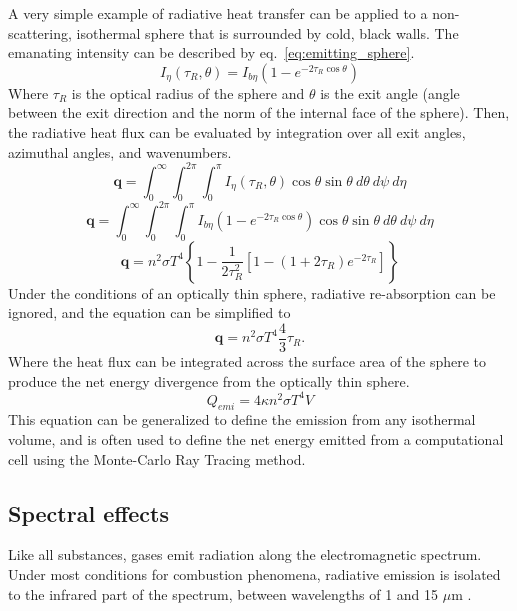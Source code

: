 A very simple example of radiative heat transfer can be applied to a non-scattering, isothermal sphere that is surrounded by cold, black walls. 
The emanating intensity can be described by eq.~\ref{eq:emitting_sphere}.
\begin{equation}
    I_\eta{}(\tau{}_R,\theta{}) = I_{b\eta{}}\left(1-e^{-2\tau{}_R\cos{\theta}}\right)
    \label{eq:emitting_sphere}
\end{equation}
Where $\tau{}_R$ is the optical radius of the sphere and $\theta{}$ is the exit angle (angle between the exit direction and the norm of the internal face of the sphere).
Then, the radiative heat flux can be evaluated by integration over all exit angles, azimuthal angles, and wavenumbers.
\begin{equation}
    \textbf{q}=\int_0^\infty{}\int_0^{2\pi}\int_0^{\pi{}}I_\eta{}(\tau{}_R,\theta)\cos{\theta}\sin{\theta}~d\theta{}~d\psi{}~d\eta{}
    \label{eq:heatflux}
\end{equation}
\begin{equation}
    \textbf{q}=\int_0^\infty{}\int_0^{2\pi}\int_0^{\pi{}}I_{b\eta{}}\left(1-e^{-2\tau{}_R\cos{\theta}}\right)\cos{\theta}\sin{\theta}~d\theta{}~d\psi{}~d\eta{}
    \label{eq:heatflux}
\end{equation}
\begin{equation}
    \textbf{q}=n^2\sigma{}T^4\left\{1-\frac{1}{2\tau{}_R^2}\left[1-(1+2\tau{}_R)e^{-2\tau{}_R}\right]\right\}
    \label{eq:heatflux}
\end{equation}
Under the conditions of an optically thin sphere, radiative re-absorption can be ignored, and the equation can be simplified to
\begin{equation}
    \textbf{q}=n^2\sigma{}T^4\frac{4}{3}\tau{}_R.
    \label{eq:heatflux}
\end{equation}
Where the heat flux can be integrated across the surface area of the sphere to produce the net energy divergence from the optically thin sphere.
\begin{equation}
    Q_{emi}=4\kappa{}n^2\sigma{}T^4V
    \label{eq:RadEmis}
\end{equation}
This equation can be generalized to define the emission from any isothermal volume, and is often used to define the net energy emitted from a computational cell using the Monte-Carlo Ray Tracing method.

\subsection{Spectral effects}\label{Sec:Nongray}
Like all substances, gases emit radiation along the electromagnetic spectrum. Under most conditions for combustion phenomena, radiative emission is isolated to the infrared part of the spectrum, between wavelengths of 1 and 15 $\mu{}$m \cite{Liu2020TheFlames}.

